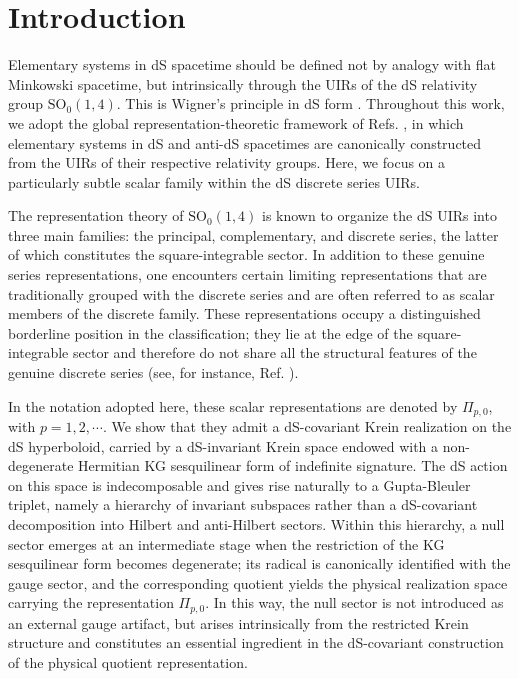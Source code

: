 \documentclass[aps,twocolumn,nofootinbib]{revtex4}
\begin{document}
\maketitle



\setcounter{equation}{0} 
\section{Introduction}

Elementary systems in dS spacetime should be defined not by analogy with flat Minkowski spacetime, but intrinsically through the UIRs of the dS relativity group $\mathrm{SO}_0(1,4)$. This is Wigner's principle in dS form \cite{Wigner1939, Wigner1949, Gazeau2022, GazPejTod2026}. Throughout this work, we adopt the global representation-theoretic framework of Refs. \cite{Gazeau2022, GazPejTod2026}, in which elementary systems in dS and anti-dS spacetimes are canonically constructed from the UIRs of their respective relativity groups. Here, we focus on a particularly subtle scalar family within the dS discrete series UIRs.

The representation theory of $\mathrm{SO}_0(1,4)$ is known \cite{Gazeau2022, GazPejTod2026, Thomas, Newton, Takahashi, Dixmier, Martin1974, Lipsman-1974} to organize the dS UIRs into three main families: the principal, complementary, and discrete series, the latter of which constitutes the square-integrable sector. In addition to these genuine series representations, one encounters certain limiting representations that are traditionally grouped with the discrete series and are often referred to as scalar members of the discrete family. These representations occupy a distinguished borderline position in the classification; they lie at the edge of the square-integrable sector and therefore do not share all the structural features of the genuine discrete series (see, for instance, Ref. \cite{Lipsman-1974}).

In the notation adopted here, these scalar representations are denoted by $\Pi_{p,0}$, with $p=1,2,\cdots$. We show that they admit a dS-covariant Krein realization on the dS hyperboloid, carried by a dS-invariant Krein space endowed with a non-degenerate Hermitian KG sesquilinear form of indefinite signature. The dS action on this space is indecomposable and gives rise naturally to a Gupta-Bleuler triplet, namely a hierarchy of invariant subspaces rather than a dS-covariant decomposition into Hilbert and anti-Hilbert sectors. Within this hierarchy, a null sector emerges at an intermediate stage when the restriction of the KG sesquilinear form becomes degenerate; its radical is canonically identified with the gauge sector, and the corresponding quotient yields the physical realization space carrying the representation $\Pi_{p,0}$. In this way, the null sector is not introduced as an external gauge artifact, but arises intrinsically from the restricted Krein structure and constitutes an essential ingredient in the dS-covariant construction of the physical quotient representation.
\end{document}
